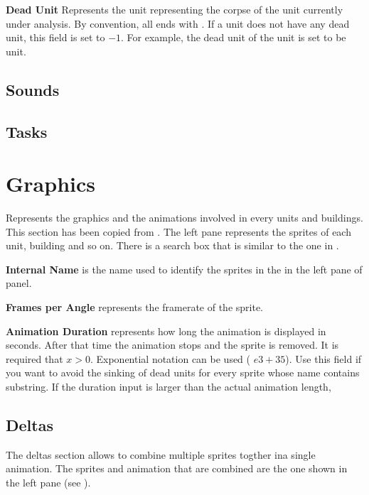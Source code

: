     \textbf{Dead Unit} Represents the unit representing the corpse of the unit currently under analysis. By convention, all  ends with . If a unit does not have any dead unit, this field is set to $-1$. For example, the dead unit of the unit  is set to be  unit.

    \subsection{Sounds}

    \subsection{Tasks}

    \section{Graphics}

    Represents the graphics and the animations involved in every units and buildings. This section has been copied from \cite{agewiki:grpahics:2014}. The left pane represents the sprites of each unit, building and so on. There is a search box that is similar to the one in .

    \textbf{Internal Name} is the name used to identify the sprites in the \genie{} in the left pane of  panel.

    \textbf{Frames per Angle} represents the framerate of the sprite.

    \textbf{Animation Duration} represents how long the animation is displayed in seconds. After that time the animation stops and the sprite is removed. It is required that $x > 0$. Exponential notation can be used (\eg{} $e3+35$). Use this field if you want to avoid the sinking of dead units for every sprite whose name contains  substring. If the duration input is larger than the actual animation length, 

    \subsection{Deltas}

    The deltas section allows to combine multiple sprites togther ina single animation. The sprites and animation that are combined are the one shown in the left pane (see ).

